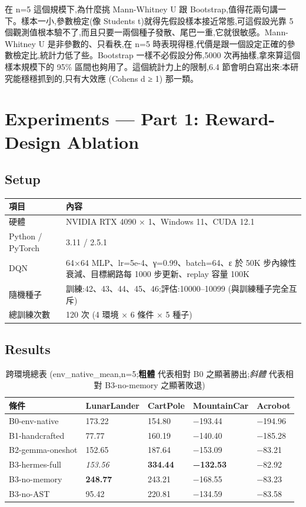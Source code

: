 \documentclass[conference,onecolumn,letterpaper,10pt]{IEEEtran}
\begin{document}
在 n=5 這個規模下,為什麼挑 Mann-Whitney U 跟 Bootstrap,值得花兩句講一下。樣本一小,參數檢定(像 Student\textquotesingle s t)就得先假設樣本接近常態,可這假設光靠 5 個觀測值根本驗不了,而且只要一兩個種子發散、尾巴一重,它就很敏感。Mann-Whitney U 是非參數的、只看秩,在 n=5 時表現得穩,代價是跟一個設定正確的參數檢定比,統計力低了些。Bootstrap 一樣不必假設分佈,5000 次再抽樣,拿來算這個樣本規模下的 95\% 區間也夠用了。這個統計力上的限制,6.4 節會明白寫出來:本研究能穩穩抓到的,只有大效應 (Cohen\textquotesingle s d ≥ 1) 那一類。


\section{Experiments --- Part 1: Reward-Design Ablation}

\subsection{Setup}

\begin{table}[t]
\centering
\small
\begin{tabular}{@{}ll@{}}
\toprule
項目 & 內容 \\
\midrule
硬體 & NVIDIA RTX 4090 × 1、Windows 11、CUDA 12.1 \\
Python / PyTorch & 3.11 / 2.5.1 \\
DQN & 64×64 MLP、lr=5e-4、γ=0.99、batch=64、ε 於 50K 步內線性衰減、目標網路每 1000 步更新、replay 容量 100K \\
隨機種子 & 訓練:42、43、44、45、46;評估:10000--10099 (與訓練種子完全互斥) \\
總訓練次數 & 120 次 (4 環境 × 6 條件 × 5 種子) \\
\bottomrule
\end{tabular}
\end{table}


\subsection{Results}

\begin{table}[t]
\centering
\caption{跨環境總表 (env\_native\_mean,n=5;\textbf{粗體} 代表相對 B0 之顯著勝出;\emph{斜體} 代表相對 B3-no-memory 之顯著敗退)}
\small
\begin{tabular}{@{}lllll@{}}
\toprule
條件 & LunarLander & CartPole & MountainCar & Acrobot \\
\midrule
B0-env-native & 173.22 & 154.80 & −193.44 & −194.96 \\
B1-handcrafted & 77.77 & 160.19 & −140.40 & −185.28 \\
B2-gemma-oneshot & 152.65 & 187.64 & −153.09 & −83.21 \\
B3-hermes-full & \emph{153.56} & \textbf{334.44} & \textbf{−132.53} & −82.92 \\
B3-no-memory & \textbf{248.77} & 243.21 & −168.55 & −83.23 \\
B3-no-AST & 95.42 & 220.81 & −134.59 & −83.58 \\
\bottomrule
\end{tabular}
\end{table}
\end{document}
